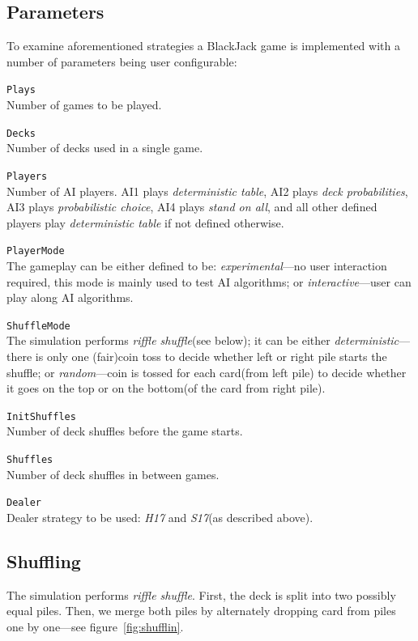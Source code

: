 \documentclass[12pt,a4paper,twocolumn]{article}
\begin{document}
\subsection*{Parameters}
To examine aforementioned strategies a BlackJack game is implemented with a number of parameters being user configurable:
\begin{description}
\item{\texttt{Plays}} \hfill\\
Number of games to be played.
\item{\texttt{Decks}} \hfill\\
Number of decks used in a single game.
\item{\texttt{Players}} \hfill\\
Number of AI players. AI1 plays \emph{deterministic table}, AI2 plays \emph{deck probabilities}, AI3 plays \emph{probabilistic choice}, AI4 plays \emph{stand on all}, and all other defined players play \emph{deterministic table} if not defined otherwise.
\item{\texttt{PlayerMode}} \hfill\\
The gameplay can be either defined to be: \emph{experimental}---no user interaction required, this mode is mainly used to test AI algorithms; or \emph{interactive}---user can play along AI algorithms.
\item{\texttt{ShuffleMode}} \hfill\\
The simulation performs \emph{riffle shuffle}(see below); it can be either \emph{deterministic}---there is only one (fair)coin toss to decide whether left or right pile starts the shuffle; or \emph{random}---coin is tossed for each card(from left pile) to decide whether it goes on the top or on the bottom(of the card from right pile).
\item{\texttt{InitShuffles}} \hfill\\
Number of deck shuffles before the game starts.
\item{\texttt{Shuffles}} \hfill\\
Number of deck shuffles in between games.
\item{\texttt{Dealer}} \hfill\\
Dealer strategy to be used: \emph{H17} and \emph{S17}(as described above).
\end{description}

\subsection*{Shuffling}
The simulation performs \emph{riffle shuffle}. First, the deck is split into two possibly equal piles. Then, we merge both piles by alternately dropping card from piles one by one---see figure~\ref{fig:shufflin}.\\
\end{document}
